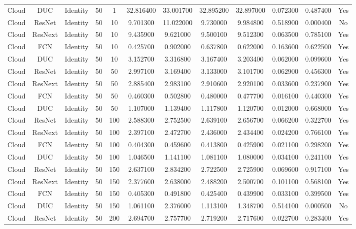 \begin{tabular}{|c||c||c||c||c||c||c||c||c||c||c||c|}
Cloud & DUC & Identity & 50 & 1 & 32.816400 & 33.001700 & 32.895200 & 32.897000 & 0.072300 & 0.487400 & Yes \\
Cloud & ResNet & Identity & 50 & 10 & 9.701300 & 11.022000 & 9.730000 & 9.984800 & 0.518900 & 0.000400 & No \\
Cloud & ResNext & Identity & 50 & 10 & 9.435900 & 9.621000 & 9.500100 & 9.512300 & 0.063500 & 0.785100 & Yes \\
Cloud & FCN & Identity & 50 & 10 & 0.425700 & 0.902000 & 0.637800 & 0.622000 & 0.163600 & 0.622500 & Yes \\
Cloud & DUC & Identity & 50 & 10 & 3.152700 & 3.316800 & 3.167400 & 3.203400 & 0.062000 & 0.099600 & Yes \\
Cloud & ResNet & Identity & 50 & 50 & 2.997100 & 3.169400 & 3.133000 & 3.101700 & 0.062900 & 0.456300 & Yes \\
Cloud & ResNext & Identity & 50 & 50 & 2.885400 & 2.983100 & 2.910600 & 2.920100 & 0.033600 & 0.237900 & Yes \\
Cloud & FCN & Identity & 50 & 50 & 0.460300 & 0.502800 & 0.480000 & 0.477700 & 0.016100 & 0.440300 & Yes \\
Cloud & DUC & Identity & 50 & 50 & 1.107000 & 1.139400 & 1.117800 & 1.120700 & 0.012000 & 0.668000 & Yes \\
Cloud & ResNet & Identity & 50 & 100 & 2.588300 & 2.752500 & 2.639100 & 2.656700 & 0.066200 & 0.322700 & Yes \\
Cloud & ResNext & Identity & 50 & 100 & 2.397100 & 2.472700 & 2.436000 & 2.434400 & 0.024200 & 0.766100 & Yes \\
Cloud & FCN & Identity & 50 & 100 & 0.404300 & 0.459600 & 0.413800 & 0.425900 & 0.021100 & 0.298200 & Yes \\
Cloud & DUC & Identity & 50 & 100 & 1.046500 & 1.141100 & 1.081100 & 1.080000 & 0.034100 & 0.241100 & Yes \\
Cloud & ResNet & Identity & 50 & 150 & 2.637100 & 2.834200 & 2.722500 & 2.725900 & 0.069600 & 0.917100 & Yes \\
Cloud & ResNext & Identity & 50 & 150 & 2.377600 & 2.638000 & 2.488200 & 2.500700 & 0.101100 & 0.568100 & Yes \\
Cloud & FCN & Identity & 50 & 150 & 0.405300 & 0.491800 & 0.425400 & 0.439900 & 0.033100 & 0.399500 & Yes \\
Cloud & DUC & Identity & 50 & 150 & 1.061100 & 2.376000 & 1.113100 & 1.348700 & 0.514100 & 0.000500 & No \\
Cloud & ResNet & Identity & 50 & 200 & 2.694700 & 2.757700 & 2.719200 & 2.717600 & 0.022700 & 0.283400 & Yes \\

\end{tabular}
